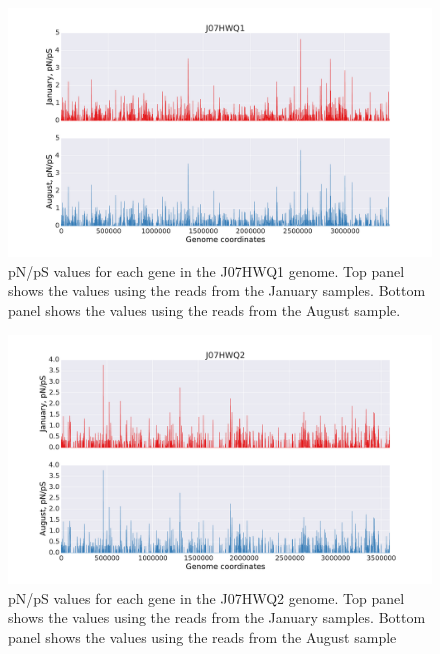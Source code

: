\begin{figure}[p]
  \centering
  \includegraphics[width=\textwidth,height=\textheight,keepaspectratio]{Chapter5/Figures/pn_ps_plots/J07HWQ1_pNpS_density.pdf}
  \caption{pN/pS values for each gene in the J07HWQ1 genome. Top panel shows the values using the reads from the January samples. Bottom panel shows the values using the reads from the August sample.}
  \label{J07HWQ1_pNpS}
\end{figure}

\begin{figure}[p]
  \centering
  \includegraphics[width=\textwidth,height=\textheight,keepaspectratio]{Chapter5/Figures/pn_ps_plots/J07HWQ2_pNpS_density.pdf}
  \caption{pN/pS values for each gene in the J07HWQ2 genome. Top panel shows the values using the reads from the January samples. Bottom panel shows the values using the reads from the August sample}
  \label{J07HWQ2_pNpS}
\end{figure}

